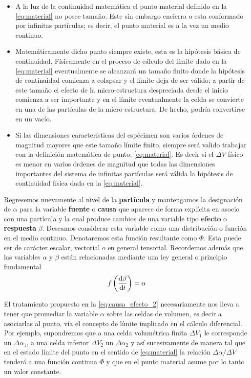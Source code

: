 \documentclass[../notas medios.tex]{subfiles}
\begin{document}
\begin{itemize}
\item A la luz de la continuidad matemática el punto material definido en la 
\cref{eq:material} no posee tamaño.  Este sin embargo encierra o esta 
conformado por infinitas partículas; es decir, el punto material es a la vez un 
medio continuo.

\item Matemáticamente dicho punto siempre existe, esta es la hipótesis básica de
continuidad.  Físicamente en el proceso de cálculo del límite dado en la
\cref{eq:material} eventualmente se alcanzará un tamaño finito donde la 
hipótesis de continuidad comienza a colapsar y el límite deja de ser válido; a 
partir de este tamaño el efecto de la micro-estructura despreciada desde el 
inicio comienza a ser importante y en el límite eventualmente la celda se 
convierte en una de las partículas de la micro-estructura.  De hecho, podría 
convertirse en un vacío.

\item Si las dimensiones características del espécimen son varios órdenes de
magnitud mayores que este tamaño límite finito, siempre será valido trabajar con
la definición matemática de punto, \cref{eq:material}.  Es decir si el $\Delta 
V$ físico es menor en varios órdenes de magnitud que todas las dimensiones
importantes del sistema de infinitas partículas será válida la hipótesis de
continuidad física dada en la \cref{eq:material}.
  
\end{itemize}

Regresemos nuevamente al nivel de la {\bf partícula} y mantengamos la
designación de $\alpha$ para la variable {\bf fuente} o {\bf causa} que aparece 
de forma explícita en asocio con una partícula y la cual produce cambios de una 
variable tipo {\bf efecto} o {\bf respuesta} $\beta$. Deseamos considerar esta 
variable como una distribución o función en el medio continuo.  Denotaremos 
esta función resultante como $\Phi$.  Esta puede ser de carácter escalar, 
vectorial o en general tensorial.  Recordemos además que las variables $\alpha$ 
y $\beta$ están relacionadas mediante una ley general o principio fundamental
\begin{equation}
f\left(\dv{\beta}{t}\right) = \alpha
\label{eq:causa_efecto_2}
\end{equation}

El tratamiento propuesto en la \cref{eq:causa_efecto_2} necesariamente nos 
lleva a tener que promediar la variable $\alpha$ sobre las celdas de volumen, 
es decir a asociarlas al punto, vía el concepto de límite implicado en el 
cálculo diferencial. Por ejemplo, supondremos que a una celda volumétrica 
finita $\Delta {V_1}$ le corresponde un $\Delta {\alpha _1}$, a una celda 
inferior $\Delta {V_2}$ un $\Delta {\alpha _2}$ y así sucesivamente de manera 
tal que en el estado límite del punto en el sentido de \cref{eq:material} la 
relación $\Delta \alpha /\Delta V$ tenderá a una función continua $\Phi$ y que 
en el punto material asume por lo tanto un valor constante.
\end{document}
